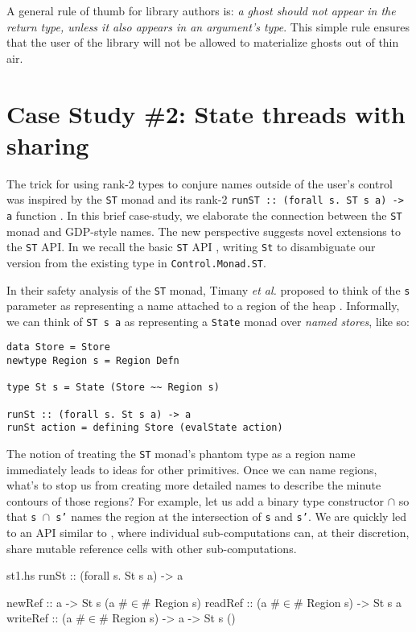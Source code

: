 \documentclass[format=sigplan, review=false, screen=true]{acmart}
\begin{document}
A general rule of thumb for library authors is:
\emph{a ghost should not appear in the return type,  unless it also appears in an argument's type}. This simple rule ensures that
the user of the library will not be allowed to materialize ghosts out of thin air.

\section{Case Study \#2: State threads with sharing}
The trick for using rank-2 types to conjure names outside of the user's control was
inspired by the \texttt{ST} monad and its rank-2 \texttt{runST :: (forall s. ST s a) -> a}
function \cite{launchbury1994lazy}. In this brief case-study, we elaborate the connection
between the \texttt{ST} monad and GDP-style names. The new perspective suggests novel
extensions to the \texttt{ST} API.
In  we recall the basic \texttt{ST} API \cite{launchbury1994lazy}, writing \texttt{St} to
disambiguate our version from the existing type in \texttt{Control.Monad.ST}.

In their safety analysis of the \texttt{ST} monad, Timany \textit{et al.} proposed to think of the \texttt{s} parameter as
representing a name attached to a region of the heap \cite{timany2017logical}.
Informally, we can think of \texttt{ST s a} as representing a \texttt{State} monad over
\emph{named stores}, like so:
\begin{verbatim}
data Store = Store
newtype Region s = Region Defn

type St s = State (Store ~~ Region s)

runSt :: (forall s. St s a) -> a
runSt action = defining Store (evalState action)
\end{verbatim}

The notion of treating the \texttt{ST} monad's phantom type as a region name immediately leads to ideas for
other primitives. Once we can name regions, what's to stop us from creating more detailed names to describe
the minute contours of those regions? For example, let us add a binary type constructor $\cap$ so that \texttt{s $\cap$ s'}
names the region at the intersection of \texttt{s} and \texttt{s'}. We are quickly led to an API similar to ,
where individual sub-computations can, at their discretion, share mutable reference cells with other sub-computations.

\begin{filecontents*}{st1.hs}
runSt    :: (forall s. St s a) -> a

newRef   :: a -> St s (a #$\in$# Region s)
readRef  :: (a #$\in$# Region s) -> St s a
writeRef :: (a #$\in$# Region s) -> a -> St s ()
\end{filecontents*}
\end{document}
